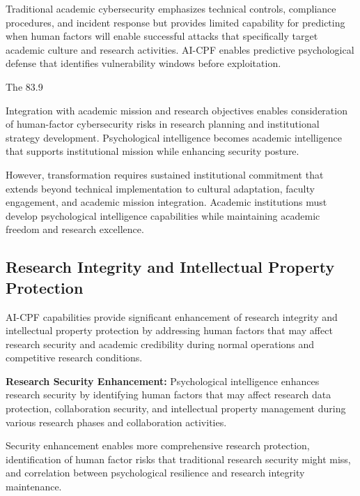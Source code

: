 \documentclass[10pt, twocolumn]{article}
\begin{document}
Traditional academic cybersecurity emphasizes technical controls, compliance procedures, and incident response but provides limited capability for predicting when human factors will enable successful attacks that specifically target academic culture and research activities. AI-CPF enables predictive psychological defense that identifies vulnerability windows before exploitation.

The 83.9%

Integration with academic mission and research objectives enables consideration of human-factor cybersecurity risks in research planning and institutional strategy development. Psychological intelligence becomes academic intelligence that supports institutional mission while enhancing security posture.

However, transformation requires sustained institutional commitment that extends beyond technical implementation to cultural adaptation, faculty engagement, and academic mission integration. Academic institutions must develop psychological intelligence capabilities while maintaining academic freedom and research excellence.

\subsection{Research Integrity and Intellectual Property Protection}

AI-CPF capabilities provide significant enhancement of research integrity and intellectual property protection by addressing human factors that may affect research security and academic credibility during normal operations and competitive research conditions.

\textbf{Research Security Enhancement:} Psychological intelligence enhances research security by identifying human factors that may affect research data protection, collaboration security, and intellectual property management during various research phases and collaboration activities.

Security enhancement enables more comprehensive research protection, identification of human factor risks that traditional research security might miss, and correlation between psychological resilience and research integrity maintenance.
\end{document}
